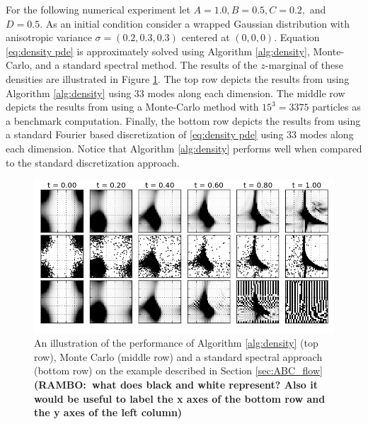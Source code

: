 \documentclass[final,leqno]{siamltex1213}
\newcommand{\ram}[1]{{\normalsize{\textbf{({\color{red}RAMBO:\ }#1)}}}}
\begin{document}
%
For the following numerical experiment let $A=1.0,B=0.5,C=0.2,$ and $D=0.5$.
As an initial condition consider a wrapped Gaussian distribution with anisotropic variance $\sigma= (0.2, 0.3, 0.3)$ centered at $(0,0,0)$.
Equation \eqref{eq:density pde} is approximately solved using Algorithm \ref{alg:density}, Monte-Carlo, and a standard spectral method.
The results of the $z$-marginal of these densities are illustrated in Figure \ref{fig:ABCD}.
The top row depicts the results from using Algorithm \ref{alg:density} using $33$ modes along each dimension.
The middle row depicts the results from using a Monte-Carlo method with $15^{3} = 3375$ particles as a benchmark computation.
Finally, the bottom row depicts the results from using a standard Fourier based discretization of \eqref{eq:density pde} using 33 modes along each dimension.
Notice that Algorithm \ref{alg:density} performs well when compared to the standard discretization approach.

\begin{figure}
	\centering
	\includegraphics[width=1\textwidth]{./images/ABCD_flow.png}
	\caption{An illustration of the performance of Algorithm \ref{alg:density} (top row), Monte Carlo (middle row) and a standard spectral approach (bottom row) on the example described in Section \ref{sec:ABC_flow} \ram{what does black and white represent? Also it would be useful to label the x axes of the bottom row and the y axes of the left column}}
	\label{fig:ABCD}
\end{figure}
\end{document}
